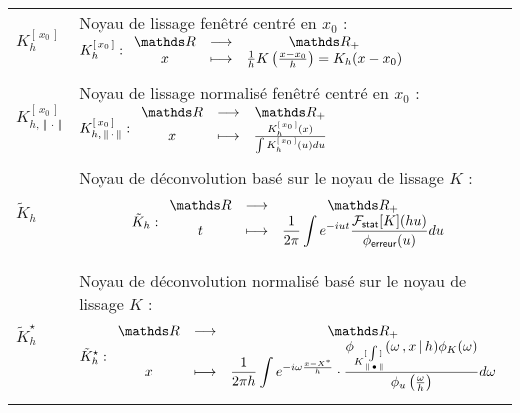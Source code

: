 \begin{tabularx}{\linewidth}{lX}
	$K_h^{[\,x_0\,]}$
	                  & Noyau de lissage fenêtré centré en $x_0$ : $K_h^{[\,x_0\,]} : \func{\grandR}{\Rplus}{x}{\frac 1 h K\left( \frac{x-x_0}{h} \right) = K_h(x-x_0)}$
	\\\\
	$K_{h,\, \Vert \,  \cdot \, \Vert}^{[\,x_0\,]}$
	                  & Noyau de lissage normalisé fenêtré centré en $x_0$ : $K_{h,\, \Vert \,  \cdot \, \Vert}^{[\,x_0\,]} : \func{\grandR}{\Rplus}{x}{\frac{K_h^{[\,x_0\,]}(x)}{\int K_h^{[\,x_0\,]}(u) du}}$
	\\
	\midrule
	\\
	$\tilde K_h$
	                  & Noyau de déconvolution basé sur le noyau de lissage $K$ : \linebreak $$\tilde K_h : \func{\grandR}{\Rplus}{t}{\displaystyle\frac 1 {2\pi} \int e^{-iut} \frac{\mathcal F_{\textsf{stat}}[K](hu)}{\phi_{\textsf{erreur}}(u)} du} $$
	\\\\
	$\tilde K_h^\star$ 
	                  & Noyau de déconvolution normalisé basé sur le noyau de lissage $K$ :\linebreak $$\tilde K_h^\star : \func{\grandR}{\Rplus}{x}{\displaystyle\frac{1}{2\pi h}\int e^{-i\omega \frac{x-X^*}{h}} \cdot \frac{ \phi_{K_{\, \lVert \, \bullet \, \rVert}^{[\,\int \,]}}(\omega \,, x\, \vert \, h) \phi_K(\omega)}{\phi_u\left(\frac \omega h\right)}d\omega} $$ 
	\\
	\bottomrule
\end{tabularx}

\pagebreak

